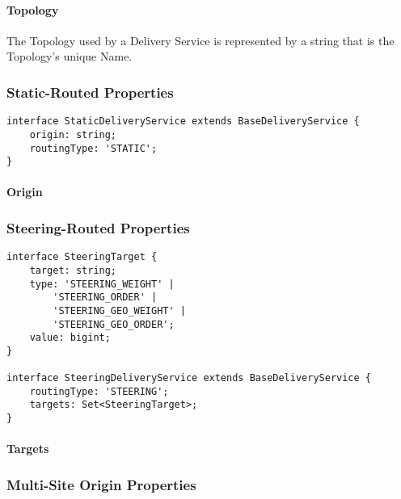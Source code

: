 \paragraph{Topology}
The Topology used by a Delivery Service is represented by a string that is the
Topology's unique Name.

\subsubsection{Static-Routed Properties}
\begin{codelisting}
\begin{verbatim}
interface StaticDeliveryService extends BaseDeliveryService {
	origin: string;
	routingType: 'STATIC';
}
\end{verbatim}
\end{codelisting}

\paragraph{Origin}

\subsubsection{Steering-Routed Properties}
\begin{codelisting}
\begin{verbatim}
interface SteeringTarget {
	target: string;
	type: 'STEERING_WEIGHT' |
		'STEERING_ORDER' |
		'STEERING_GEO_WEIGHT' |
		'STEERING_GEO_ORDER';
	value: bigint;
}

interface SteeringDeliveryService extends BaseDeliveryService {
	routingType: 'STEERING';
	targets: Set<SteeringTarget>;
}
\end{verbatim}
\end{codelisting}

\paragraph{Targets}

\subsubsection{Multi-Site Origin Properties\label{sec:mso-props}}
